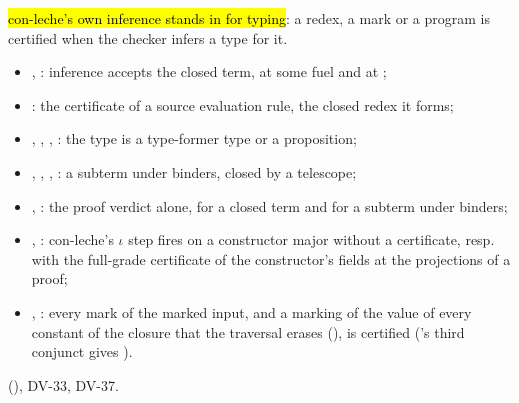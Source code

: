 \begin{definition}
  \label{def:EraseProof-CLCert}
  \leanok
   \hl{con-leche's own inference stands in for typing}: a redex, a mark or a program is certified when the checker infers a type for it.
  \begin{itemize}
  \item {}, : inference accepts the closed term, at some fuel and at ;
  \item {}: the certificate of a source evaluation rule, the closed redex it forms;
  \item {}, , , : the type is a type-former type or a proposition;
  \item {}, , , : a subterm under binders, closed by a telescope;
  \item {}, : the proof verdict alone, for a closed term and for a subterm under binders;
  \item {}, : con-leche's $\iota$ step fires on a constructor major without a certificate, resp. with the full-grade certificate of the constructor's fields at the projections of a proof;
  \item {}, : every mark of the marked input, and a marking of the value of every constant of the closure that the traversal erases (), is certified ('s third conjunct gives ).
  \end{itemize}
    (), DV-33, DV-37.
\end{definition}

